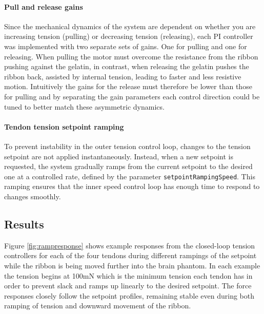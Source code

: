 \paragraph*{Pull and release gains}
Since the mechanical dynamics of the system are dependent on whether you are increasing tension (pulling) or decreasing tension (releasing), each PI controller was implemented with two separate sets of gains. One for pulling and one for releasing. When pulling the motor must overcome the resistance from the ribbon pushing against the gelatin, in contrast, when releasing the gelatin pushes the ribbon back, assisted by internal tension, leading to faster and less resistive motion. Intuitively the gains for the release must therefore be lower than those for pulling and by separating the gain parameters each control direction could be tuned to better match these asymmetric dynamics.

\paragraph*{Tendon tension setpoint ramping}
To prevent instability in the outer tension control loop, changes to the tension setpoint are not applied instantaneously. Instead, when a new setpoint is requested, the system gradually ramps from the current setpoint to the desired one at a controlled rate, defined by the parameter \texttt{setpointRampingSpeed}. This ramping ensures that the inner speed control loop has enough time to respond to changes smoothly.


\subsection{Results}
Figure \ref{fig:rampresponse} shows example responses from the closed-loop tension controllers for each of the four tendons during different rampings of the setpoint while the ribbon is being moved further into the brain phantom. In each example the tension begins at 100mN which is the minimum tension each tendon has in order to prevent slack and ramps up linearly to the desired setpoint. The force responses closely follow the setpoint profiles, remaining stable even during both ramping of tension and downward movement of the ribbon.

